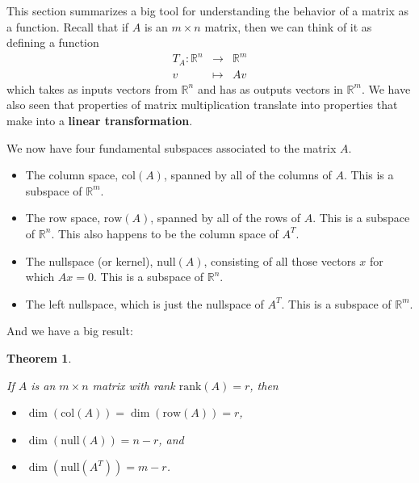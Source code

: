 \documentclass[10pt,]{book}
\newcommand{\terminology}[1]{\textbf{#1}}
\theoremstyle{plain}
\newtheorem{theorem}{Theorem}[chapter]
\theoremstyle{definition}
\numberwithin{equation}{section}
\begin{document}
      This section summarizes a big tool for understanding the behavior of a
      matrix as a function.
      Recall that if \(A\) is an \(m\times n\) matrix, then we can
      think of it as defining a function
      \[
        \begin{array}{rcl}
        T_A: \mathbb{R}^n & \rightarrow & \mathbb{R}^m \\
        v\phantom{R} & \mapsto & Av
        \end{array}
      \]
      which takes as inputs vectors from \(\mathbb{R}^n\) and has as
      outputs vectors in \(\mathbb{R}^m\). We have also seen that
      properties of matrix multiplication translate into properties that
      make into a \terminology{linear transformation}.
\par

      We now have four fundamental subspaces associated to the matrix \(A\).
\begin{itemize}
\item{}The column space, \(\mathrm{col}(A)\), spanned by all of the
        columns of \(A\). This is a subspace of \(\mathbb{R}^m\).
      \item{}The row space, \(\mathrm{row}(A)\), spanned by all of the rows
        of \(A\). This is a subspace of \(\mathbb{R}^n\). This also
        happens to be the column space of \(A^T\).
      \item{}The nullspace (or kernel), \(\mathrm{null}(A)\), consisting of
        all those vectors \(x\) for which \(Ax=0\). This is a subspace
        of \(\mathbb{R}^n\).
      \item{}The left nullspace, which is just the nullspace of \(A^T\). This
        is a subspace of \(\mathbb{R}^m\).
      \end{itemize}
\par

      And we have a big result:
\begin{theorem}\label{theorem-7}

        If \(A\) is an \(m\times n\) matrix with rank
        \(\mathrm{rank}(A) = r\), then
        \begin{itemize}
\item{}\(\dim(\mathrm{col}(A)) = \dim(\mathrm{row}(A)) = r\),\item{}\(\dim(\mathrm{null}(A)) = n-r\), and\item{}\(\dim(\mathrm{null}(A^T))= m-r\).\end{itemize}
\end{theorem}
\par
\end{document}
